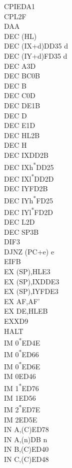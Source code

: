 \documentclass[twoside,openright,a4paper]{book}
\begin{document}
\begin{multicols}{3}
{\begin{tabbing}
	CPI\>EDA1\\
	CPL\>2F\\
	DAA\\
	DEC (HL)\\
	DEC (IX+d)\>DD35 d\\
	DEC (IY+d)\>FD35 d\\
	DEC A\>3D\\
	DEC BC\>0B\\
	DEC B\\
	DEC C\>0D\\
	DEC DE\>1B\\
	DEC D\\
	DEC E\>1D\\
	DEC HL\>2B\\
	DEC H\\
	DEC IX\>DD2B\\
	DEC IXh\textsuperscript{*}\>DD25\\
	DEC IXl\textsuperscript{*}\>DD2D\\
	DEC IY\>FD2B\\
	DEC IYh\textsuperscript{*}\>FD25\\
	DEC IYl\textsuperscript{*}\>FD2D\\
	DEC L\>2D\\
	DEC SP\>3B\\
	DI\>F3\\
	DJNZ (PC+e) e\\
	EI\>FB\\
	EX (SP),HL\>E3\\
	EX (SP),IX\>DDE3\\
	EX (SP),IY\>FDE3\\
	EX AF,AF'\\
	EX DE,HL\>EB\\
	EXX\>D9\\
	HALT\\
	IM 0\textsuperscript{*}\>ED4E\\
	IM 0\textsuperscript{*}\>ED66\\
	IM 0\textsuperscript{*}\>ED6E\\
	IM 0\>ED46\\
	IM 1\textsuperscript{*}\>ED76\\
	IM 1\>ED56\\
	IM 2\textsuperscript{*}\>ED7E\\
	IM 2\>ED5E\\
	IN A,(C)\>ED78\\
	IN A,(n)\>DB n\\
	IN B,(C)\>ED40\\
	IN C,(C)\>ED48\\

\end{tabbing}}
\end{multicols}
\end{document}
